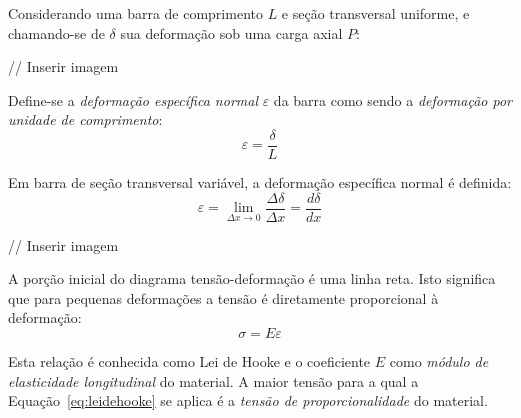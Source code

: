 Considerando uma barra de comprimento $L$ e seção transversal uniforme, e chamando-se de $\delta$ sua deformação sob uma carga axial $P$:

// Inserir imagem

Define-se a \textit{deformação específica normal} $\varepsilon$ da barra como sendo a \textit{deformação por unidade de comprimento}:
\begin{equation}\label{eq:def-espec}
	\varepsilon=\frac{\delta}{L}
\end{equation}

Em barra de seção transversal variável, a deformação específica normal é definida:
\begin{equation}
	\varepsilon=\lim_{\Delta x\rightarrow0}\frac{\Delta\delta}{\Delta x}=\frac{d\delta}{dx}
\end{equation}

// Inserir imagem

A porção inicial do diagrama tensão-deformação é uma linha reta. Isto significa que para pequenas deformações a tensão é diretamente proporcional à deformação:
\begin{equation}\label{eq:leidehooke}
	\sigma=E\varepsilon
\end{equation}

Esta relação é conhecida como Lei de Hooke e o coeficiente $E$ como \textit{módulo de elasticidade longitudinal} do material. A maior tensão para a qual a Equação~\eqref{eq:leidehooke} se aplica é a \textit{tensão de proporcionalidade} do material.